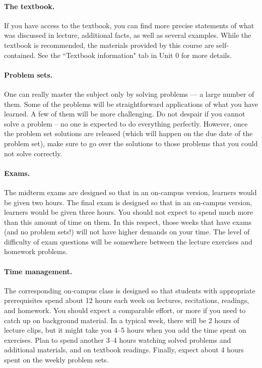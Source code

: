 \documentclass[pdftex, brazil, 12pt, twoside]{article}
\begin{document}
\paragraph{The textbook.} If you have access to the textbook, you can find more precise
statements of what was discussed in lecture, additional facts, as well as several
examples. While the textbook is recommended, the materials provided by this course
are self-contained. See the “Textbook information" tab in Unit 0 for more details.

\paragraph{Problem sets.} One can really master the subject only by solving problems ---
a large number of them. Some of the problems will be straightforward applications
of what you have learned. A few of them will be more challenging. Do not despair
if you cannot solve a problem – no one is expected to do everything perfectly.
However, once the problem set solutions are released (which will happen on the due
date of the problem set), make sure to go over the solutions to those problems
that you could not solve correctly.

\paragraph{Exams.} The midterm exams are designed so that in an on-campus version,
learners would be given two hours. The final exam is designed so that in an on-campus
version, learners would be given three hours. You should not expect to spend much more
than this amount of time on them. In this respect, those weeks that have exams
(and no problem sets!) will not have higher demands on your time. The level of
difficulty of exam questions will be somewhere between the lecture exercises and
homework problems.

\paragraph{Time management.} The corresponding on-campus class is designed so that
students with appropriate prerequisites spend about 12 hours each week on lectures,
recitations, readings, and homework. You should expect a comparable effort, or more
if you need to catch up on background material. In a typical week, there will be 2
hours of lecture clips, but it might take you 4--5 hours when you add the time spent
on exercises. Plan to spend another 3--4 hours watching solved problems and additional
materials, and on textbook readings. Finally, expect about 4 hours spent on the
weekly problem sets.
\end{document}
